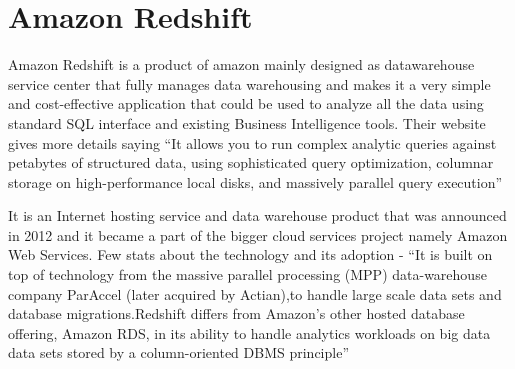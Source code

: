 \section{Amazon Redshift}

Amazon Redshift is a product of amazon mainly designed as
datawarehouse service center that fully manages data warehousing and
makes it a very simple and cost-effective application that could be
used to analyze all the data using standard SQL interface and existing
Business Intelligence tools.  Their website gives more details saying
``It allows you to run complex analytic queries against petabytes of
structured data, using sophisticated query optimization, columnar
storage on high-performance local disks, and massively parallel query
execution''~\cite{Amazon Redshift}

It is an Internet hosting service and data warehouse product that was
announced in 2012 and it became a part of the bigger cloud services
project namely Amazon Web Services. Few stats about the technology and
its adoption - ``It is built on top of technology from the massive
parallel processing (MPP) data-warehouse company ParAccel (later
acquired by Actian),to handle large scale data sets and database
migrations.Redshift differs from Amazon's other hosted database
offering, Amazon RDS, in its ability to handle analytics workloads on
big data data sets stored by a column-oriented DBMS
principle''~\cite{AmazonWiki}

